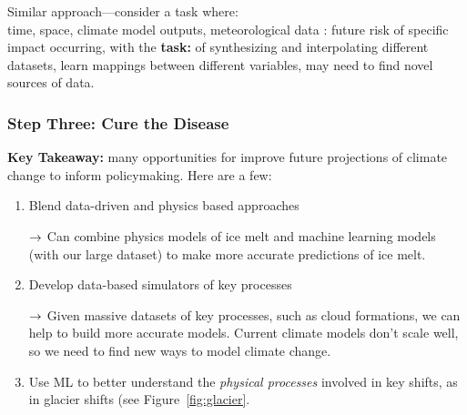 Similar approach---consider a task where: \\
\hspace{8mm}{\bf input:} time, space, climate model outputs, meteorological data
\hspace{8mm}{\bf output}: future risk of specific impact occurring, with the {\bf task:} of synthesizing and interpolating different datasets, learn mappings between different variables, may need to find novel sources of data.\\

\subsubsection{Step Three: Cure the Disease}

{\bf Key Takeaway:} many opportunities for improve future projections of climate change to inform policymaking. Here are a few:

\begin{enumerate}
    \item Blend data-driven and physics based approaches
    
    $\rightarrow$ Can combine physics models of ice melt and machine learning models (with our large dataset) to make more accurate predictions of ice melt.
    
    \item Develop data-based simulators of key processes
    
    $\rightarrow$ Given massive datasets of key processes, such as cloud formations, we can help to build more accurate models. Current climate models don't scale well, so we need to find new ways to model climate change.
    
    \item Use ML to better understand the {\it physical processes} involved in key shifts, as in glacier shifts (see Figure~\ref{fig:glacier}.
    
\end{enumerate}

